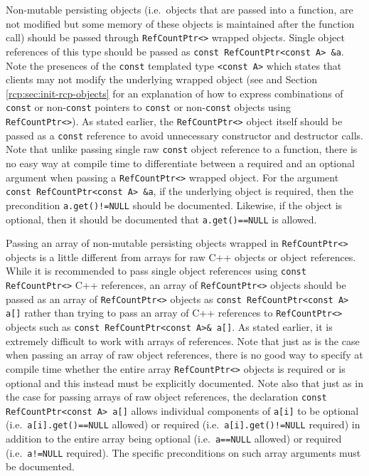 Non-mutable persisting objects (i.e.~objects that are passed into
a function, are not modified but some memory of these objects is
maintained after the function call) should be passed through
{}\texttt{Ref\-Count\-Ptr<>} wrapped objects.  Single object
references of this type should be passed as {}\texttt{const
Ref\-Count\-Ptr<const A> \&a}.  Note the presences of the
{}\texttt{const} templated type {}\texttt{<const A>} which states that
clients may not modify the underlying wrapped object (see
{}\cite[Appendix B]{ref:RefCountPtrBeginnersGuide} and Section
{}\ref{rcp:sec:init-rcp-objects} for an explanation of how to express
combinations of {}\texttt{const} or non-{}\texttt{const} pointers to
{}\texttt{const} or non-{}\texttt{const} objects using
{}\texttt{Ref\-Count\-Ptr<>}).  As stated earlier, the
{}\texttt{Ref\-Count\-Ptr<>} object itself should be passed as a
{}\texttt{const} reference to avoid unnecessary constructor and
destructor calls.  Note that unlike passing single raw
{}\texttt{const} object reference to a function, there is no easy way
at compile time to differentiate between a required and an optional
argument when passing a {}\texttt{Ref\-Count\-Ptr<>} wrapped object.
For the argument {}\texttt{const Ref\-Count\-Ptr<const A> \&a}, if the
underlying object is required, then the precondition
{}\texttt{a.get()!=NULL} should be documented.  Likewise, if the
object is optional, then it should be documented that
{}\texttt{a.get()==NULL} is allowed.

Passing an array of non-mutable persisting objects wrapped in
{}\texttt{Ref\-Count\-Ptr<>} objects is a little different from arrays
for raw C++ objects or object references.  While it is recommended to
pass single object references using {}\texttt{const}
{}\texttt{Ref\-Count\-Ptr<>} C++ references, an array of
{}\texttt{Ref\-Count\-Ptr<>} objects should be passed as an array of
{}\texttt{Ref\-Count\-Ptr<>} objects as {}\texttt{const
Ref\-Count\-Ptr<const A> a[]} rather than trying to pass an array of
C++ references to {}\texttt{Ref\-Count\-Ptr<>} objects such as
{}\texttt{const Ref\-Count\-Ptr<const A>\& a[]}.  As stated earlier,
it is extremely difficult to work with arrays of references.  Note
that just as is the case when passing an array of raw object
references, there is no good way to specify at compile time whether
the entire array {}\texttt{Ref\-Count\-Ptr<>} objects is required or
is optional and this instead must be explicitly documented.  Note also
that just as in the case for passing arrays of raw object references,
the declaration {}\texttt{const Ref\-Count\-Ptr<const A> a[]} allows
individual components of {}\texttt{a[i]} to be optional
(i.e.~{}\texttt{a[i].get()==NULL} allowed) or required
(i.e.~{}\texttt{a[i].get()!=NULL} required) in addition to the entire
array being optional (i.e.~{}\texttt{a==NULL} allowed) or required
(i.e.~{}\texttt{a!=NULL} required).  The specific preconditions on
such array arguments must be documented.

